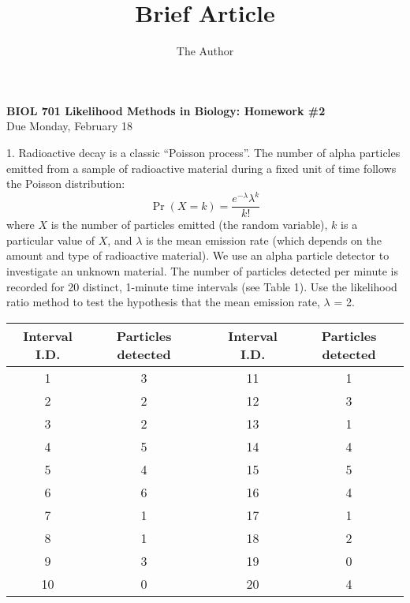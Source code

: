 \documentclass[11pt]{article}
\title{Brief Article}
\author{The Author}
\begin{document}
\begin{center}
	{\bf BIOL 701  Likelihood Methods in Biology: Homework \#2}\\
	{Due Monday, February 18} 
\end{center}
1. Radioactive decay is a classic ``Poisson process''.  The number of alpha particles emitted from a sample of radioactive material during a fixed unit of time follows the Poisson distribution:
$$\Pr(X=k) = \frac{e^{-\lambda}\lambda^k}{k!}$$
where $X$ is the number of particles emitted (the random variable), $k$ is a particular value of $X$, and $\lambda$ is the mean emission rate (which depends on the amount and type of radioactive material).
We use an alpha particle detector to investigate an unknown material.  The number of particles detected per minute is recorded for 20 distinct, 1-minute time intervals (see Table 1).  
Use the likelihood ratio method to test the hypothesis that the mean emission rate, $\lambda$ = 2.
\begin{table}[htdp]
\begin{center}
\begin{tabular}{c|cp{1in}c|c}
\hline
Interval	I.D. & Particles detected & & Interval	I.D. & Particles detected \\
\hline
1	& 3 & & 11	& 1 \\
2	& 2 & & 12	& 3 \\
3	& 2 & & 13	& 1 \\
4	& 5 & & 14	& 4 \\
5	& 4 & & 15	& 5 \\
6	& 6 & & 16	& 4 \\
7	& 1 & & 17	& 1 \\
8	& 1 & & 18	& 2 \\
9	& 3 & & 19	& 0 \\
10	& 0 & & 20	& 4 \\
\hline
\end{tabular}
\end{center}
\label{default}
\end{table}
\newpage
\end{document}
